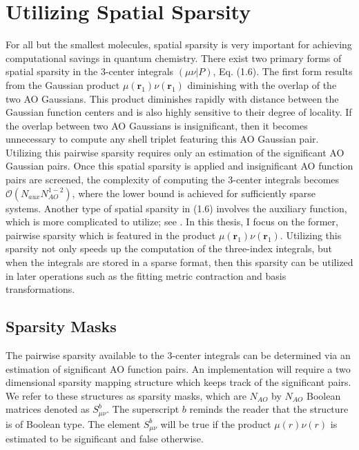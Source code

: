 \chapter{Utilizing Spatial Sparsity}

For all but the smallest molecules, spatial sparsity is very important for achieving computational savings
in quantum chemistry. There exist two primary forms of spatial sparsity in the 3-center integrals $(\mu \nu |P)$, Eq. (1.6). 
The first form results from the Gaussian product $\mu(\textbf{r}_{1}) \nu(\textbf{r}_{1})$ diminishing with the overlap of the 
two AO Gaussians. This product diminishes rapidly with distance between the Gaussian function centers and is also 
highly sensitive to their degree of locality.
If the overlap between two AO Gaussians is insignificant, then it becomes unnecessary to compute any shell triplet featuring
this AO Gaussian pair.
Utilizing this pairwise sparsity requires only an estimation of the significant AO Gaussian pairs.
Once this spatial sparsity is applied and insignificant AO function pairs are screened, the complexity of 
computing the 3-center integrals becomes $\mathcal{O}(N_{aux}N_{AO}^{1-2})$, where the lower bound is achieved for sufficiently 
sparse systems. Another type of spatial sparsity in (1.6) involves the auxiliary function, which is more complicated to 
utilize; see \cite{ref5}. In this thesis, I focus on the former, pairwise sparsity which is featured
in the product $\mu(\textbf{r}_{1}) \nu(\textbf{r}_{1})$. 
Utilizing this sparsity not only speeds up the computation of the three-index integrals, but when the integrals are stored in a sparse format,
then this sparsity can be utilized in later operations such as the fitting metric contraction and basis transformations.

\section{Sparsity Masks}

The pairwise sparsity available to the 3-center integrals can be determined via an estimation of significant AO function pairs.
An implementation will require a two dimensional sparsity mapping structure which keeps track of the significant pairs.
We refer to these structures as sparsity masks, which are $N_{AO}$ by $N_{AO}$ Boolean matrices denoted as $S_{\mu \nu}^b$. 
The superscript $b$ reminds the reader that the structure is of Boolean type.
The element $S_{\mu \nu}^b$ will be true if the product $\mu(r)\nu(r)$ is estimated to be significant 
and false otherwise.

